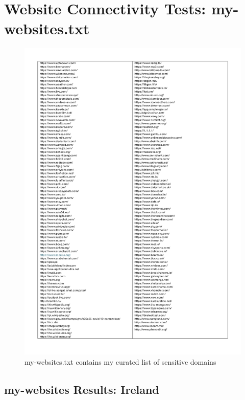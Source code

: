 \section{Website Connectivity Tests: my-websites.txt}
\begin{figure} [H]
    \centering
    \includegraphics[width=1\linewidth]{appendix/my-webs1.pdf}
    \caption{my-websites.txt contains my curated list of sensitive domains}
    \label{fig:enter-label}
\end{figure}

\subsection{my-websites Results: Ireland}

